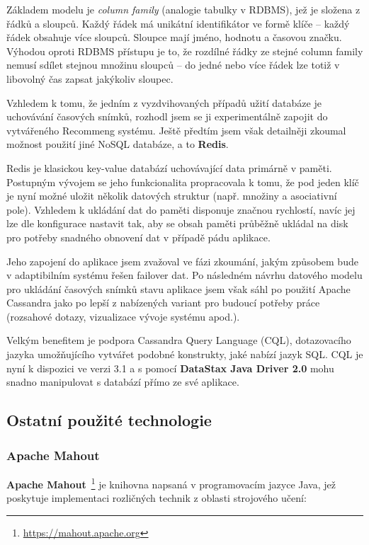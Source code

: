 \documentclass[thesis=M,czech]{FITthesis}[2014/05/07]
\begin{document}
Základem modelu je \emph{column family} (analogie tabulky v RDBMS), jež je složena z řádků a sloupců. Každý řádek má unikátní identifikátor ve formě klíče – každý řádek obsahuje více sloupců. Sloupce mají jméno, hodnotu a časovou značku. Výhodou oproti RDBMS přístupu je to, že rozdílné řádky ze stejné column family nemusí sdílet stejnou množinu sloupců – do jedné nebo více řádek lze totiž v libovolný čas zapsat jakýkoliv sloupec.

Vzhledem k tomu, že jedním z vyzdvihovaných případů užití databáze je uchovávání časových snímků, rozhodl jsem se ji experimentálně zapojit do vytvářeného Recommeng systému. Ještě předtím jsem však detailněji zkoumal možnost použití jiné NoSQL databáze, a to \textbf{Redis}. 

Redis je klasickou key-value databází uchovávající data primárně v paměti. Postupným vývojem se jeho funkcionalita propracovala k tomu, že pod jeden klíč je nyní možné uložit několik datových struktur (např. množiny a asociativní pole). Vzhledem k ukládání dat do paměti disponuje značnou rychlostí, navíc jej lze dle konfigurace nastavit tak, aby se obsah paměti průběžně ukládal na disk pro potřeby snadného obnovení dat v případě pádu aplikace.

Jeho zapojení do aplikace jsem zvažoval ve fázi zkoumání, jakým způsobem bude v adaptibilním systému řešen failover dat. Po následném návrhu datového modelu pro ukládání časových snímků stavu aplikace jsem však sáhl po použití Apache Cassandra jako po lepší z nabízených variant pro budoucí potřeby práce (rozsahové dotazy, vizualizace vývoje systému apod.). 

Velkým benefitem je podpora Cassandra Query Language (CQL), dotazovacího jazyka umožňujícího vytvářet podobné konstrukty, jaké nabízí jazyk SQL. CQL je nyní k dispozici ve verzi 3.1 a s pomocí \textbf{DataStax Java Driver 2.0} mohu snadno manipulovat s databází přímo ze své aplikace. 

\subsection{Ostatní použité technologie}

\subsubsection{Apache Mahout}
\textbf{Apache Mahout}~\footnote{\url{https://mahout.apache.org}} je knihovna napsaná v programovacím jazyce Java, jež poskytuje implementaci rozličných technik z oblasti strojového učení:
\end{document}
